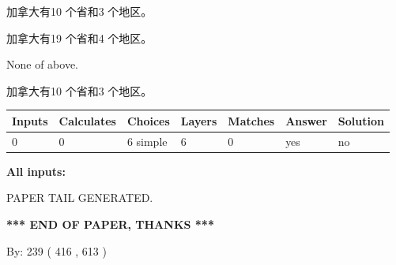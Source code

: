 \documentclass{ctexart}
\begin{document}
 
加拿大有10 个省和3 个地区。
 
 
加拿大有19 个省和4 个地区。
 
 
 None of above.
 
 
\noindent{}
 
 
加拿大有10 个省和3 个地区。
 
 
\noindent{}
 
 
   
   
   
   
\noindent\begin{tabular}{|l|l|l|l|l|l|l|}
 \hline
Inputs & Calculates & Choices & Layers & Matches & Answer & Solution \\ \hline
 0  & 
 0  & 
 6
  simple  
  & 
 6  & 
 0  & 
  yes & 
  no 
  \\ \hline
 \end{tabular}
   
   
   
   
\noindent{}
   
   
   
   
\noindent\vspace{0.1in}\hspace{-0.08in} {\textbf{\Large{All inputs: }}}
   
   
   
   
   
   
 \vspace{0.2in}
 
   
   
\vspace{2.0in} PAPER TAIL GENERATED.
   
   
   
   
\vspace{1.0in} 
{\textbf{\large{ *** END OF PAPER, THANKS *** }}} 
   
   
\hspace{1.0in} By: 
 239 ( 416 ,  613 )
   
   
   
   
\newpage 
\setcounter{page}{ 
   558001 } 
   
   
   
\end{document}
